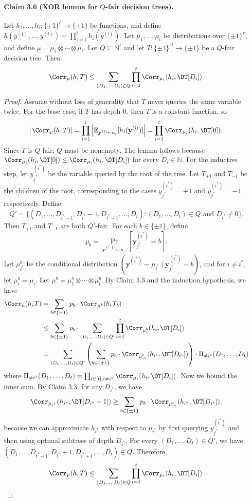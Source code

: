 \paragraph{Claim 3.6 (XOR lemma for $Q$-fair decision trees).} Let $h_1,\ldots,h_t:\{\pm1\}^r\to\{\pm1\}$ be functions, and define $h(y^{(1)},\ldots,y^{(t)})=\prod_{i=1}^t h_i(y^{(i)})$. Let $\mu_1,\ldots,\mu_t$ be distributions over $\{\pm1\}^r$, and define $\mu=\mu_1\otimes\cdots\otimes\mu_t$. Let $Q\subseteq\mathbb N^t$ and let $T:\{\pm1\}^{rt}\to\{\pm1\}$ be a $Q$-fair decision tree. Then
\[\Corr_\mu(h,T)\le\sum_{(D_1,\ldots,D_t)\in Q}\prod_{i=1}^t\Corr_{\mu_i}(h_i,\DT[D_i]).\]
\begin{proof}
Assume without loss of generality that $T$ never queries the same variable twice. For the base case, if $T$ has depth 0, then $T$ is a constant function, so
\[|\Corr_\mu(h,T)|=\prod_{i=1}^t\left|\mathbb E_{\mathbf y^{(i)}\sim\mu_i}[h_i(\mathbf y^{(i)})]\right|=\prod_{i=1}^t\Corr_{\mu_i}(h_i,\DT[0]).\]
Since $T$ is $Q$-fair, $Q$ must be nonempty. The lemma follows because $\Corr_{\mu_i}(h_i,\DT[0])\le\Corr_{\mu_i}(h_i,\DT[D_i])$ for every $D_i\in\mathbb N$. For the inductive step, let $y_{j^*}^{(i^*)}$ be the variable queried by the root of the tree. Let $T_{+1}$ and $T_{-1}$ be the children of the root, corresponding to the cases $y_{j^*}^{(i^*)}=+1$ and $y_{j^*}^{(i^*)}=-1$ respectively. Define
\[Q'=\{(D_1,\ldots,D_{i^*-1},D_{i^*}-1,D_{i^*+1},\ldots,D_t):(D_1,\ldots,D_t)\in Q\text{ and }D_{i^*}\ne0\}.\]
Then $T_{+1}$ and $T_{-1}$ are both $Q'$-fair.
For each $b\in\{\pm1\}$, define
\[p_b=\Pr_{\mathbf y^{(i^*)}\sim\mu_{i^*}}[\mathbf y_{j^*}^{(i^*)}=b].\]
Let $\mu_{i^*}^b$ be the conditional distribution $(\mathbf y^{(i^*)}\sim\mu_{i^*}\mid\mathbf y_{j^*}^{(i^*)}=b)$, and for $i\ne i^*$, let $\mu_i^b=\mu_i$. Let $\mu^b=\mu_1^b\otimes\cdots\otimes\mu_t^b$. By Claim 3.3 and the induction hypothesis, we have
\begin{align*}
\Corr_\mu(h,T)&=\sum_{b\in\{\pm1\}}p_b\cdot\Corr_{\mu^b}(h,T_b)\\
&\le\sum_{b\in\{\pm1\}}p_b\cdot\sum_{(D_1,\ldots,D_t)\in Q'}\prod_{i=1}^t\Corr_{\mu_i^b}(h_i,\DT[D_i])\\
&=\sum_{(D_1,\ldots,D_t)\in Q'}\left(\sum_{b\in\{\pm1\}}p_b\cdot\Corr_{\mu_{i^*}^b}(h_{i^*},\DT[D_{i^*}])\right)\cdot\Pi_{\ne i^*}(D_1,\ldots,D_t)
\end{align*}
where $\Pi_{\ne i^*}(D_1,\ldots,D_t)=\prod_{i\in[t],i\ne i^*}\Corr_{\mu_i}(h_i,\DT[D_i])$. Now we bound the inner sum. By Claim 3.3, for any $D_{i^*}$, we have
\[\Corr_{\mu_{i^*}}(h_{i^*},\DT[D_{i^*}+1])\ge\sum_{b\in\{\pm1\}}p_b\cdot\Corr_{\mu_{i^*}^b}(h_{i^*},\DT[D_{i^*}]),\]
because we can approximate $h_{i^*}$ with respect to $\mu_{i^*}$ by first querying $y_{j^*}^{(i^*)}$ and then using optimal subtrees of depth $D_{i^*}$. For every $(D_1,\ldots,D_t)\in Q'$, we have $(D_1,\ldots,D_{i^*-1},D_{i^*}+1,D_{i^*+1},\ldots,D_t)\in Q$. Therefore,
\[\Corr_\mu(h,T)\le\sum_{(D_1,\ldots,D_t)\in Q}\prod_{i=1}^t\Corr_{\mu_i}(h_i,\DT[D_i]).\]
\end{proof}

